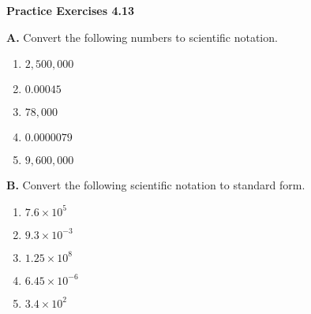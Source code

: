 \vspace{0.3ex}
\noindent\textbf{Practice Exercises 4.13}

\vspace{0.2ex}

\noindent\textbf{A.} Convert the following numbers to scientific notation.
\begin{multicols}{3}
\begin{enumerate}
    \item \( 2,500,000 \)  
    \item \( 0.00045 \)  
    \item \( 78,000 \)  
    \item \( 0.0000079 \)  
    \item \( 9,600,000 \)  
\end{enumerate}
\end{multicols}

\noindent\textbf{B.} Convert the following scientific notation to standard form.
\begin{multicols}{3}
\begin{enumerate}
    \item \( 7.6 \times 10^5 \)  
    \item \( 9.3 \times 10^{-3} \)  
    \item \( 1.25 \times 10^8 \)  
    \item \( 6.45 \times 10^{-6} \)  
    \item \( 3.4 \times 10^2 \)  
\end{enumerate}
\end{multicols}
